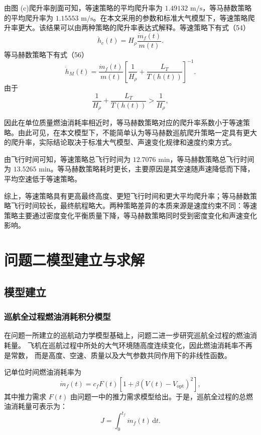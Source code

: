 \documentclass[UTF8]{ctexart}
\begin{document}
由图 (c)爬升率剖面可知，等速策略的平均爬升率为 $1.49132\text{ m/s}$，等马赫数策略的平均爬升率为 $1.15553\text{ m/s}$。在本文采用的参数和标准大气模型下，等速策略爬升率更大。该结果可以由两种策略的爬升率表达式解释。等速策略下有式（54）
$$\dot h_c(t)=H_\rho\frac{\dot m_f(t)}{m(t)}.$$
等马赫数策略下有式（56）
$$\dot h_M(t) = \frac{\dot m_f(t)}{m(t)} \left[ \frac{1}{H_\rho} + \frac{L_T}{T(h(t))} \right]^{-1}.$$
由于
$$\frac{1}{H_\rho}+\frac{L_T}{T(h(t))}>\frac{1}{H_\rho},$$

因此在单位质量燃油消耗率相近时，等马赫数策略对应的爬升率系数小于等速策略。由此可见，在本文模型下，不能简单认为等马赫数巡航爬升策略一定具有更大的爬升率，实际结论取决于标准大气模型、声速变化规律和速度约束方式。

由飞行时间可知，等速策略总飞行时间为 $12.7076\text{ min}$，等马赫数策略总飞行时间为 $13.5265\text{ min}$。等马赫数策略耗时更长，主要原因是其空速随声速降低而下降，平均空速低于等速策略。

综上，等速策略具有更高最终高度、更短飞行时间和更大平均爬升率；等马赫数策略飞行时间较长，最终航程略大。两种策略差异的本质来源是速度约束不同：等速策略主要通过密度变化平衡质量下降，等马赫数策略同时受到密度变化和声速变化影响。
\section{问题二模型建立与求解}
\subsection{模型建立}
\subsubsection{巡航全过程燃油消耗积分模型}

在问题一所建立的巡航动力学模型基础上，问题二进一步研究巡航全过程的燃油消耗量。
飞机在巡航过程中所处的大气环境随高度连续变化，因此燃油消耗率不再是常数，
而是高度、空速、质量以及大气参数共同作用下的非线性函数。

记单位时间燃油消耗率为
\begin{equation}
    \dot m_f(t)
    =
    c_fF(t)
    \left[
    1+\beta\left(V(t)-V_{\mathrm{opt}}\right)^2
    \right],
    \label{eq:q2_fuel_rate}
\end{equation}
其中推力需求 $F(t)$ 由问题一中的推力需求模型给出。于是，巡航全过程的总燃油消耗量可表示为：
\begin{equation}
    J
    =
    \int_{0}^{t_f}\dot m_f(t)\,\mathrm{d}t.
    \label{eq:q2_total_fuel_time}
\end{equation}
\end{document}
